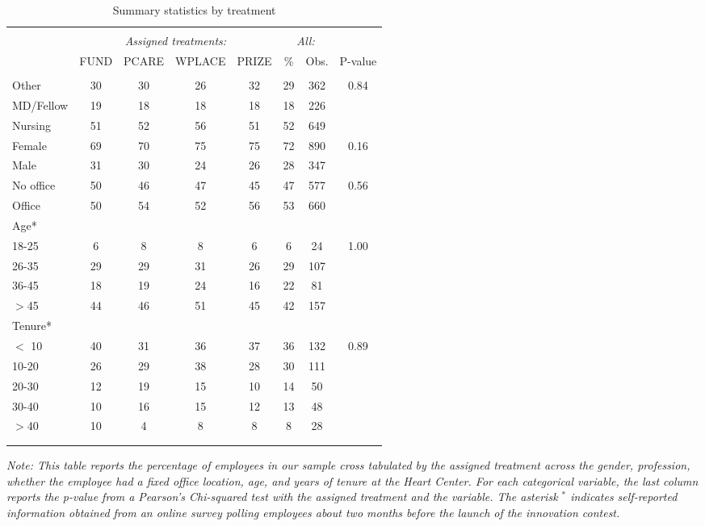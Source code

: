 \begin{table}
\centering
\caption{Summary statistics by treatment}
\label{summary-statistics}
\begin{tabular}{@{}lccccccc}
  \\[-1.8ex]\hline \hline \\[-1.8ex]
 & \multicolumn{4}{c}{\emph{Assigned treatments:}} 
						& \multicolumn{2}{c}{\emph{All:}}\\
						\cmidrule(lr){2-5}\cmidrule(lr){6-7} & FUND & PCARE & WPLACE & PRIZE & \% & Obs. & P-value \\ 
  \hline \\[-1.86ex]
Other & 30 & 30 & 26 & 32 & 29 & 362 & 0.84 \\ 
  MD/Fellow & 19 & 18 & 18 & 18 & 18 & 226 &  \\ 
  Nursing & 51 & 52 & 56 & 51 & 52 & 649 &  \\ 
  Female & 69 & 70 & 75 & 75 & 72 & 890 & 0.16 \\ 
  Male & 31 & 30 & 24 & 26 & 28 & 347 &  \\ 
  [1.86ex] No office & 50 & 46 & 47 & 45 & 47 & 577 & 0.56 \\ 
  Office & 50 & 54 & 52 & 56 & 53 & 660 &  \\ 
   [1.86ex] Age* &&&&&&\\
18-25 & 6 & 8 & 8 & 6 & 6 & 24 & 1.00 \\ 
  26-35 & 29 & 29 & 31 & 26 & 29 & 107 &  \\ 
  36-45 & 18 & 19 & 24 & 16 & 22 & 81 &  \\ 
  $>$45 & 44 & 46 & 51 & 45 & 42 & 157 &  \\ 
   [1.86ex] Tenure* &&&&&&\\
$<$ 10 & 40 & 31 & 36 & 37 & 36 & 132 & 0.89 \\ 
  10-20 & 26 & 29 & 38 & 28 & 30 & 111 &  \\ 
  20-30 & 12 & 19 & 15 & 10 & 14 & 50 &  \\ 
  30-40 & 10 & 16 & 15 & 12 & 13 & 48 &  \\ 
  $>$40 & 10 & 4 & 8 & 8 & 8 & 28 &  \\ 
   \\[-1.8ex]\hline \hline \\[-1.8ex]
\end{tabular}
\begin{minipage}{\textwidth}\itshape\footnotesize
Note: This table reports the percentage of employees in our sample cross tabulated by the assigned treatment across the gender, profession, whether the employee had a fixed office location, age, and years of tenure at the Heart Center. For each categorical variable, the last column reports the p-value from a Pearson's Chi-squared test with the assigned treatment and the variable. The asterisk $^{\ast}$ indicates self-reported information obtained from an online survey polling employees about two months before the launch of the innovation contest.
\end{minipage}
\end{table}
